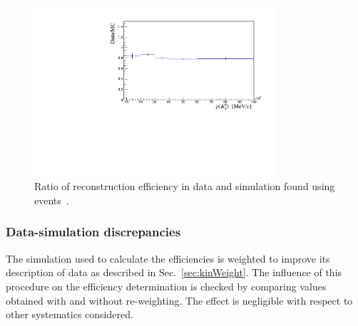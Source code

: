 \begin{figure}
\centering
\includegraphics[width=0.8\textwidth]{Lmumu/figs/DDvtx_eff_POwen.pdf}
\caption{Ratio of reconstruction efficiency in data and simulation found using \KS events~\cite{Blake:1631348}.}
\label{KS_vtxeff}
\end{figure}

\subsubsection{Data-simulation discrepancies}

The simulation used to calculate the efficiencies is weighted to 
improve its description of data as described in Sec.~\ref{sec:kinWeight}.
The influence of this procedure on the efficiency determination is checked by comparing values obtained with
and without re-weighting. The effect is negligible with respect to other systematics considered.



